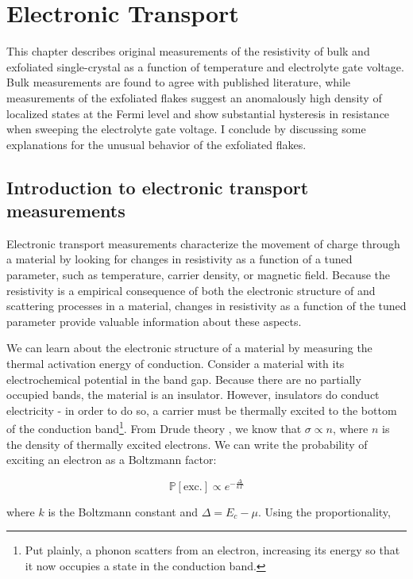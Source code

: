 \chapter{Electronic Transport}
This chapter describes original measurements of the resistivity of bulk and exfoliated single-crystal \rucl as a function of temperature and electrolyte gate voltage. Bulk measurements are found to agree with published literature, while measurements of the exfoliated flakes suggest an anomalously high density of localized states at the Fermi level and show substantial hysteresis in resistance when sweeping the electrolyte gate voltage. I conclude by discussing some explanations for the unusual behavior of the exfoliated flakes.

\section{Introduction to electronic transport measurements}

Electronic transport measurements characterize the movement of charge through a material by looking for changes in resistivity as a function of a tuned parameter, such as temperature, carrier density, or magnetic field. Because the resistivity is a empirical consequence of both the electronic structure of and scattering processes in a material, changes in resistivity as a function of the tuned parameter provide valuable information about these aspects.

We can learn about the electronic structure of a material by measuring the thermal activation energy of conduction. Consider a material with its electrochemical potential in the band gap. Because there are no partially occupied bands, the material is an insulator. However, insulators do conduct electricity - in order to do so, a carrier must be thermally excited to the bottom of the conduction band\footnote{Put plainly, a phonon scatters from an electron, increasing its energy so that it now occupies a state in the conduction band.}. From Drude theory \cite{Ashcroft1976}, we know that $\sigma \propto n$, where $n$ is the density of thermally excited electrons. We can write the probability of exciting an electron as a Boltzmann factor:

\begin{equation}
\mathbb{P}[\text{exc.}] \propto e^{-\frac{\Delta}{kT}}
\end{equation}

where $k$ is the Boltzmann constant and $\Delta = E_{c} - \mu$. Using the proportionality,

